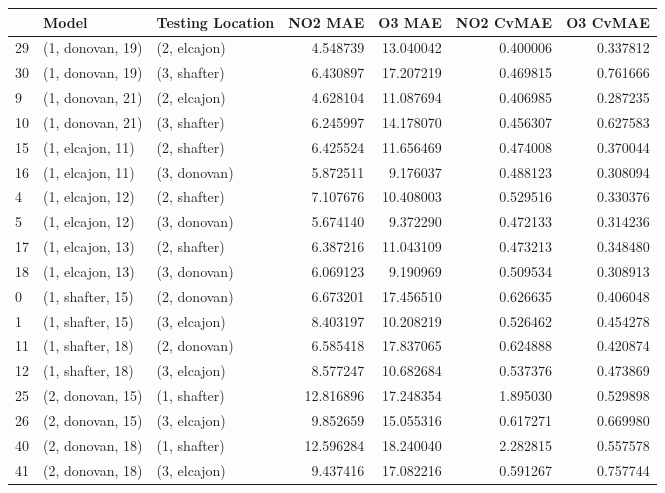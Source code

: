 \begin{tabular}{lllrrrr}
\toprule
{} &             Model & Testing Location &    NO2 MAE &     O3 MAE &  NO2 CvMAE &  O3 CvMAE \\
\midrule
29 &  (1, donovan, 19) &     (2, elcajon) &   4.548739 &  13.040042 &   0.400006 &  0.337812 \\
30 &  (1, donovan, 19) &     (3, shafter) &   6.430897 &  17.207219 &   0.469815 &  0.761666 \\
9  &  (1, donovan, 21) &     (2, elcajon) &   4.628104 &  11.087694 &   0.406985 &  0.287235 \\
10 &  (1, donovan, 21) &     (3, shafter) &   6.245997 &  14.178070 &   0.456307 &  0.627583 \\
15 &  (1, elcajon, 11) &     (2, shafter) &   6.425524 &  11.656469 &   0.474008 &  0.370044 \\
16 &  (1, elcajon, 11) &     (3, donovan) &   5.872511 &   9.176037 &   0.488123 &  0.308094 \\
4  &  (1, elcajon, 12) &     (2, shafter) &   7.107676 &  10.408003 &   0.529516 &  0.330376 \\
5  &  (1, elcajon, 12) &     (3, donovan) &   5.674140 &   9.372290 &   0.472133 &  0.314236 \\
17 &  (1, elcajon, 13) &     (2, shafter) &   6.387216 &  11.043109 &   0.473213 &  0.348480 \\
18 &  (1, elcajon, 13) &     (3, donovan) &   6.069123 &   9.190969 &   0.509534 &  0.308913 \\
0  &  (1, shafter, 15) &     (2, donovan) &   6.673201 &  17.456510 &   0.626635 &  0.406048 \\
1  &  (1, shafter, 15) &     (3, elcajon) &   8.403197 &  10.208219 &   0.526462 &  0.454278 \\
11 &  (1, shafter, 18) &     (2, donovan) &   6.585418 &  17.837065 &   0.624888 &  0.420874 \\
12 &  (1, shafter, 18) &     (3, elcajon) &   8.577247 &  10.682684 &   0.537376 &  0.473869 \\
25 &  (2, donovan, 15) &     (1, shafter) &  12.816896 &  17.248354 &   1.895030 &  0.529898 \\
26 &  (2, donovan, 15) &     (3, elcajon) &   9.852659 &  15.055316 &   0.617271 &  0.669980 \\
40 &  (2, donovan, 18) &     (1, shafter) &  12.596284 &  18.240040 &   2.282815 &  0.557578 \\
41 &  (2, donovan, 18) &     (3, elcajon) &   9.437416 &  17.082216 &   0.591267 &  0.757744 \\

\end{tabular}
